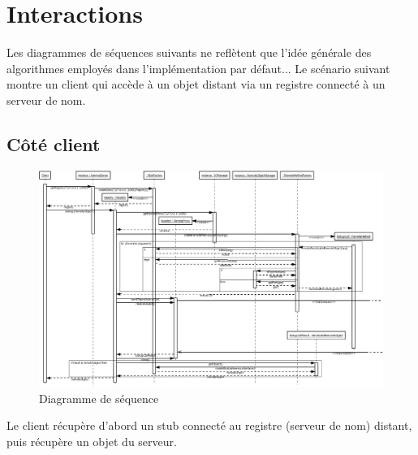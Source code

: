 \chapter{Interactions}

Les diagrammes de séquences suivants ne reflètent que l'idée générale des algorithmes employés dans l'implémentation par défaut... Le scénario suivant montre un client qui accède à un objet distant via un registre connecté à un serveur de nom.

\section{Côté client}
\begin{figure}[H]
\begin{center}
\includegraphics[scale=0.4,angle=90]{img/diag_sequence_client.jpeg}
\caption{Diagramme de séquence}
\end{center}
\end{figure}
\medskip
Le client récupère d'abord un stub connecté au registre (serveur de nom) distant, puis récupère un objet du serveur.

